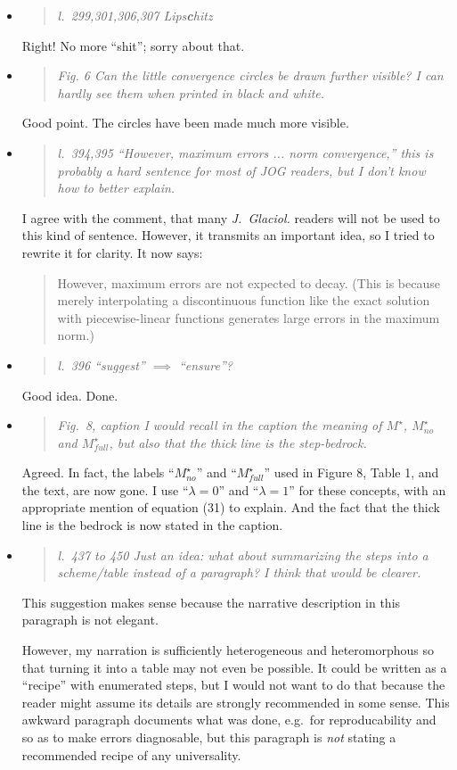 \documentclass[11pt,reqno]{amsart}
\newcommand{\reply}[2]{
\medskip\medskip
\item  \begin{quote}
\emph{#1}
\end{quote}

\medskip
\noindent #2}
\begin{document}
\begin{itemize}
\reply{l.~299,301,306,307 Lips\textbf{c}hitz}
{Right!  No more ``shit''; sorry about that.}

\reply{Fig. 6 Can the little convergence circles be drawn further visible? I can hardly see them
when printed in black and white.}
{Good point.  The circles have been made much more visible.}

\reply{l.~394,395 ``However, maximum errors ... norm convergence,'' this is probably a hard sentence for most of JOG readers, but I don't know how to better explain.}
{I agree with the comment, that many \emph{J.~Glaciol.} readers will not be used to this kind of sentence.  However, it transmits an important idea, so I tried to rewrite it for clarity.  It now says:
\begin{quote}
However, maximum errors are not expected to decay.  (This is because merely interpolating a discontinuous function like the exact solution with piecewise-linear functions generates large errors in the maximum norm.)
\end{quote}}

\reply{l.~396 ``suggest'' $\implies$ ``ensure''?}
{Good idea.  Done.}

\reply{Fig.~8, caption I would recall in the caption the meaning of $M^\star$, $M_{no}^\star$ and $M_{full}^\star$, but also that the thick line is the step-bedrock.}
{Agreed.  In fact, the labels ``$M_{no}^\star$'' and ``$M_{full}^\star$'' used in Figure 8, Table 1, and the text, are now gone.  I use ``$\lambda=0$'' and ``$\lambda=1$'' for these concepts, with an appropriate mention of equation (31) to explain.  And the fact that the thick line is the bedrock is now stated in the caption.}

\reply{l.~437 to 450 Just an idea: what about summarizing the steps into a scheme/table instead of
a paragraph? I think that would be clearer.}
{This suggestion makes sense because the narrative description in this paragraph is not elegant.

However, my narration is sufficiently heterogeneous and heteromorphous so that turning it into a table may not even be possible.  It could be written as a ``recipe'' with enumerated steps, but I would not want to do that because the reader might assume its details are strongly recommended in some sense.  This awkward paragraph documents what was done, e.g.~for reproducability and so as to make errors diagnosable, but this paragraph is \emph{not} stating a recommended recipe of any universality.}
\end{itemize}
\end{document}
